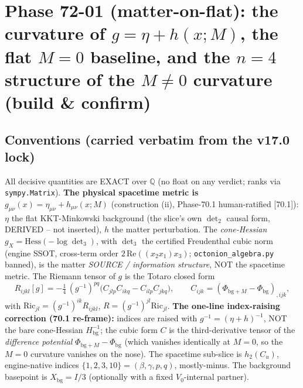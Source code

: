 %

\section{Phase 72-01 (matter-on-flat): the curvature of $g=\eta+h(x;M)$, the flat $M=0$ baseline, and the $n=4$ structure of the $M\neq0$ curvature (build \& confirm)}

\subsection{Conventions (carried verbatim from the v17.0 lock)}

All decisive quantities are EXACT over $\mathbb{Q}$ (no float on any verdict; ranks
via \texttt{sympy.Matrix}). \textbf{The physical spacetime metric is
$g_{\mu\nu}(x)=\eta_{\mu\nu}+h_{\mu\nu}(x;M)$} (construction (ii), Phase-70.1
human-ratified [70.1]): $\eta$ the flat KKT-Minkowski background (the slice's own
$\det_2$ causal form, DERIVED -- not inserted), $h$ the matter perturbation. The
\emph{cone-Hessian} $g_X=\mathrm{Hess}(-\log\det_3)$, with $\det_3$ the certified
Freudenthal cubic norm (engine SSOT, cross-term order $2\,\mathrm{Re}((x_2 x_1)x_3)$;
\texttt{octonion\_algebra.py} banned), is the matter \emph{SOURCE / information
structure}, NOT the spacetime metric. The Riemann tensor of $g$ is the Totaro closed
form
\begin{equation}
  R_{ijkl}[g] = -\tfrac14\, (g^{-1})^{pq}\big(C_{jlp}C_{ikq}-C_{ilp}C_{jkq}\big),
  \qquad C_{ijk}=(\Phi_{\mathrm{bg}+M}-\Phi_{\mathrm{bg}})_{,ijk},
  \label{eq:totaro}
\end{equation}
with $\mathrm{Ric}_{jl}=(g^{-1})^{ik}R_{ijkl}$, $R=(g^{-1})^{jl}\mathrm{Ric}_{jl}$.
\textbf{The one-line index-raising correction (70.1 re-frame):} indices are raised
with $g^{-1}=(\eta+h)^{-1}$, NOT the bare cone-Hessian $H_{\mathrm{bg}}^{-1}$; the
cubic form $C$ is the third-derivative tensor of the \emph{difference potential}
$\Phi_{\mathrm{bg}+M}-\Phi_{\mathrm{bg}}$ (which vanishes identically at $M=0$, so the
$M=0$ curvature vanishes on the nose). The spacetime sub-slice is $h_2(C_u)$,
engine-native indices $\{1,2,3,10\}=(\beta,\gamma,p,q)$, mostly-minus. The background
basepoint is $X_{\mathrm{bg}}=I/3$ (optionally with a fixed $V_0$-internal partner).

